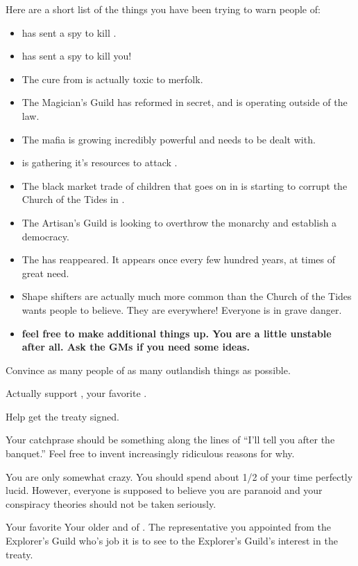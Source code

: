 \documentclass[char]{NeptuneBall}
\begin{document}
Here are a short list of the things you have been trying to warn people of:
\begin{itemize}
 \item \pPacifica{} has sent a spy to kill \cKing{}.
 \item \pPacifica{} has sent a spy to kill you!
 \item The \cPolio{} cure from \pAmerica{} is actually toxic to merfolk.
 \item The Magician's Guild has reformed in secret, and is operating outside of the law.
 \item The mafia is growing incredibly powerful and needs to be dealt with.
 \item \pIndia{} is gathering it's resources to attack \pAtlantis{}.
 \item The black market trade of children that goes on in \pPacifica{} is starting to corrupt the Church of the Tides in \pAtlantis{}.
 \item The Artisan's Guild is looking to overthrow the monarchy and establish a democracy.
 \item The \iWishingStone{\MYname} has reappeared. It appears once every few hundred years, at times of great need.
 \item Shape shifters are actually much more common than the Church of the Tides wants people to believe. They are everywhere! Everyone is in grave danger.
 \item {\bf feel free to make additional things up. You are a little unstable after all. Ask the GMs if you need some ideas.}
\end{itemize}


\begin{itemz}[Goals]
  \item Convince as many people of as many outlandish things as possible.
  \item Actually support \cPrincess{}, your favorite \cPrincess{\nephew}.
  \item Help \cKing{} get the treaty signed.
\end{itemz}

\begin{itemz}[Notes]
  \item Your catchprase should be something along the lines of ``I'll tell you after the banquet.'' Feel free to invent increasingly ridiculous reasons for why.
  \item You are only somewhat crazy. You should spend about 1/2 of your time perfectly lucid. However, everyone is supposed to believe you are paranoid and your conspiracy theories should not be taken seriously.
\end{itemz}

\begin{contacts}
  \contact{\cPrincess{}} Your favorite \cPrincess{\nephew}
  \contact{\cKing{}} Your older \cKing{\sibling} and \cKing{\King} of \pAtlantis{}.
  \contact{\cPriest{}} The representative you appointed from the Explorer's Guild who's job it is to see to the Explorer's Guild's interest in the treaty.
\end{contacts}
\end{document}
